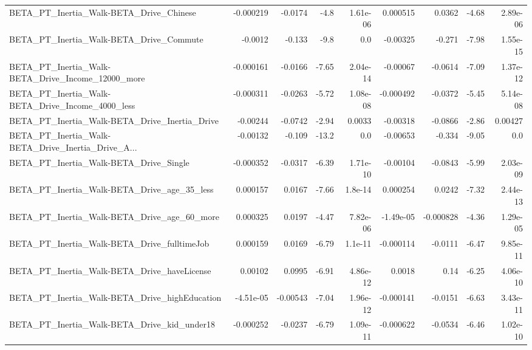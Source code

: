 \begin{tabular}{lrrrrrrrr}
BETA\_PT\_Inertia\_Walk-BETA\_Drive\_Chinese            &   -0.000219 &      -0.0174 &     -4.8 & 1.61e-06 &   0.000515 &      0.0362 &        -4.68 &      2.89e-06 \\
BETA\_PT\_Inertia\_Walk-BETA\_Drive\_Commute            &     -0.0012 &       -0.133 &     -9.8 &      0.0 &   -0.00325 &      -0.271 &        -7.98 &      1.55e-15 \\
BETA\_PT\_Inertia\_Walk-BETA\_Drive\_Income\_12000\_more  &   -0.000161 &      -0.0166 &    -7.65 & 2.04e-14 &   -0.00067 &     -0.0614 &        -7.09 &      1.37e-12 \\
BETA\_PT\_Inertia\_Walk-BETA\_Drive\_Income\_4000\_less   &   -0.000311 &      -0.0263 &    -5.72 & 1.08e-08 &  -0.000492 &     -0.0372 &        -5.45 &      5.14e-08 \\
BETA\_PT\_Inertia\_Walk-BETA\_Drive\_Inertia\_Drive      &    -0.00244 &      -0.0742 &    -2.94 &   0.0033 &   -0.00318 &     -0.0866 &        -2.86 &       0.00427 \\
BETA\_PT\_Inertia\_Walk-BETA\_Drive\_Inertia\_Drive\_A... &    -0.00132 &       -0.109 &    -13.2 &      0.0 &   -0.00653 &      -0.334 &        -9.05 &           0.0 \\
BETA\_PT\_Inertia\_Walk-BETA\_Drive\_Single             &   -0.000352 &      -0.0317 &    -6.39 & 1.71e-10 &   -0.00104 &     -0.0843 &        -5.99 &      2.03e-09 \\
BETA\_PT\_Inertia\_Walk-BETA\_Drive\_age\_35\_less        &    0.000157 &       0.0167 &    -7.66 &  1.8e-14 &   0.000254 &      0.0242 &        -7.32 &      2.44e-13 \\
BETA\_PT\_Inertia\_Walk-BETA\_Drive\_age\_60\_more        &    0.000325 &       0.0197 &    -4.47 & 7.82e-06 &  -1.49e-05 &   -0.000828 &        -4.36 &      1.29e-05 \\
BETA\_PT\_Inertia\_Walk-BETA\_Drive\_fulltimeJob        &    0.000159 &       0.0169 &    -6.79 &  1.1e-11 &  -0.000114 &     -0.0111 &        -6.47 &      9.85e-11 \\
BETA\_PT\_Inertia\_Walk-BETA\_Drive\_haveLicense        &     0.00102 &       0.0995 &    -6.91 & 4.86e-12 &     0.0018 &        0.14 &        -6.25 &      4.06e-10 \\
BETA\_PT\_Inertia\_Walk-BETA\_Drive\_highEducation      &   -4.51e-05 &     -0.00543 &    -7.04 & 1.96e-12 &  -0.000141 &     -0.0151 &        -6.63 &      3.43e-11 \\
BETA\_PT\_Inertia\_Walk-BETA\_Drive\_kid\_under18        &   -0.000252 &      -0.0237 &    -6.79 & 1.09e-11 &  -0.000622 &     -0.0534 &        -6.46 &      1.02e-10 \\

\end{tabular}
